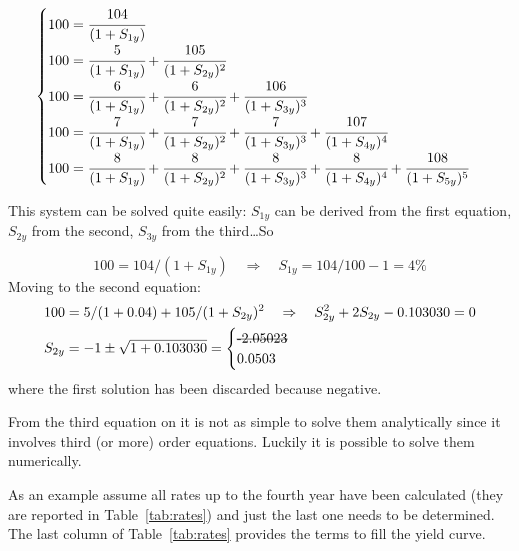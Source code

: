\begin{equation}
\begin{cases}
100 = \cfrac{104}{(1 + S_{1y})} \\
100 = \cfrac{5}{(1 + S_{1y})} + \cfrac{105}{(1 + S_{2y})^{2}} \\
100 = \cfrac{6} {(1 + S_{1y})} + \cfrac{6}{(1 + S_{2y})^{2}} + \cfrac{106} {(1 + S_{3y})^{3}} \\
100 = \cfrac{7} {(1 + S_{1y})} + \cfrac{7} {(1 + S_{2y})^{2}} + \cfrac{7} {(1 + S_{3y})^{3}} + \cfrac{107} {(1 + S_{4y})^{4}} \\
100 = \cfrac{8} {(1 + S_{1y})} + \cfrac{8} {(1 + S_{2y})^{2}}+ \cfrac{8} {(1 + S_{3y})^{3}} + \cfrac{8} {(1 + S_{4y})^{4}} + \cfrac{108} {(1 + S_{5y})^{5}}
\end{cases}
\label{eq:fifth_year_rate}
\end{equation}

This system can be solved quite easily: $S_{1y}$ can be derived from the first equation, $S_{2y}$ from the second, $S_{3y}$ from the third\ldots So

\begin{equation}
100 = 104 / (1 + S_{1y})\quad\Rightarrow\quad S_{1y} = 104/100 - 1 = 4\%
\end{equation}
Moving to the second equation:
\begin{equation}
\begin{split}
& 100 = 5 / (1 + 0.04) + 105 / (1 + S_{2y})^{2}\quad\Rightarrow\quad S_{2y}^2  + 2 S_{2y}  - 0.103030 = 0 \\
& S_{2y} = - 1 \pm \sqrt{1 + 0.103030} = \begin{cases}\text{\sout{-2.05023}} \\ 0.0503\end{cases}
\end{split}
\end{equation}
where the first solution has been discarded because negative.

From the third equation on it is not as simple to solve them analytically since it involves third (or more) order equations. Luckily it is possible to solve them numerically.

As an example assume all rates up to the fourth year have been calculated (they are reported in Table~\ref{tab:rates}) and just the last one needs to be determined. The last column of Table~\ref{tab:rates} provides the terms to fill the yield curve.

